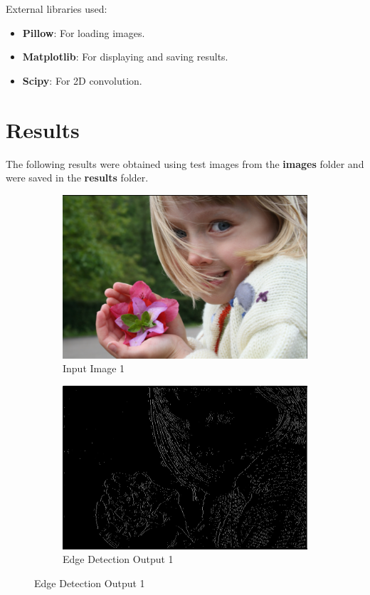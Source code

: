 \documentclass[12pt]{article}
\begin{document}
External libraries used:
\begin{itemize}
	\item \textbf{Pillow}: For loading images.
	\item \textbf{Matplotlib}: For displaying and saving results.
	\item \textbf{Scipy}: For 2D convolution.
\end{itemize}

\section*{Results}
The following results were obtained using test images from the \textbf{images} folder and were saved in the \textbf{results} folder.


\begin{figure}[!ht]
	\centering
	\begin{subfigure}{0.45\textwidth}
		\includegraphics[width=\textwidth]{../images/child.png}
		\caption{Input Image 1}
	\end{subfigure}
	\hfill
	\begin{subfigure}{0.45\textwidth}
		\includegraphics[width=\textwidth]{../results/child.png}
		\caption{Edge Detection Output 1}
	\end{subfigure}


\end{figure}
\end{document}
